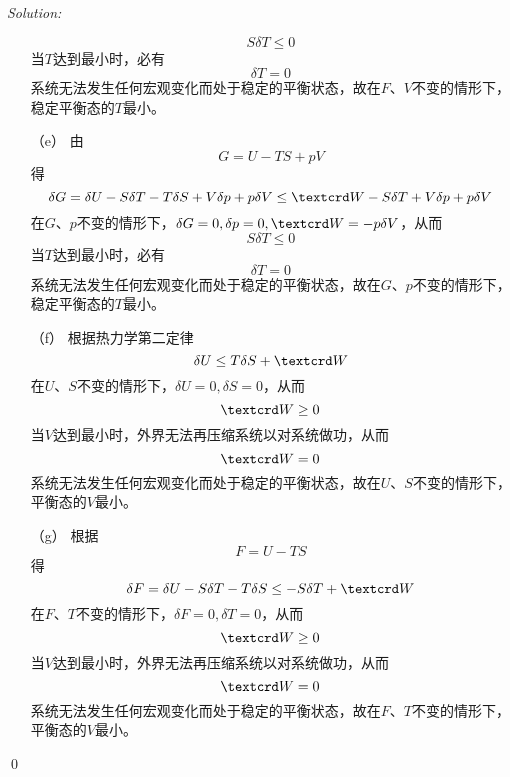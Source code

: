 \documentclass[12pt,a4paper]{article}
\newenvironment{sol}
    {\emph{Solution:}
    }
    {
    \qed
    }
\begin{document}
\begin{sol}
\begin{itemize}
\begin{equation}
S\delta T\leq 0
\end{equation}
当$T$达到最小时，必有
\begin{equation}
\delta T=0
\end{equation}
系统无法发生任何宏观变化而处于稳定的平衡状态，故在$F$、$V$不变的情形下，稳定平衡态的$T$最小。
\item[（e）] 由
\begin{equation}
G=U-TS+pV
\end{equation}
得
\begin{equation}
\delta G=\delta U-S\delta T-T\delta S+V\delta p+p\delta V\leq\text{\textcrd}W-S\delta T+V\delta p+p\delta V
\end{equation}
在$G$、$p$不变的情形下，$\delta G=0,\delta p=0,\text{\textcrd}W=-p\delta V$，从而
\begin{equation}
S\delta T\leq0
\end{equation}
当$T$达到最小时，必有
\begin{equation}
\delta T=0
\end{equation}
系统无法发生任何宏观变化而处于稳定的平衡状态，故在$G$、$p$不变的情形下，稳定平衡态的$T$最小。
\item[（f）] 根据热力学第二定律
\begin{equation}
\delta U\leq T\delta S+\text{\textcrd}W
\end{equation}
在$U$、$S$不变的情形下，$\delta U=0,\delta S=0$，从而
\begin{equation}
\text{\textcrd}W\geq0
\end{equation}
当$V$达到最小时，外界无法再压缩系统以对系统做功，从而
\begin{equation}
\text{\textcrd}W=0
\end{equation}
系统无法发生任何宏观变化而处于稳定的平衡状态，故在$U$、$S$不变的情形下，平衡态的$V$最小。
\item[（g）] 根据
\begin{equation}
F=U-TS
\end{equation}
得
\begin{equation}
\delta F=\delta U-S\delta T-T\delta S\leq -S\delta T+\text{\textcrd}W
\end{equation}
在$F$、$T$不变的情形下，$\delta F=0,\delta T=0$，从而
\begin{equation}
\text{\textcrd}W\geq0
\end{equation}
当$V$达到最小时，外界无法再压缩系统以对系统做功，从而
\begin{equation}
\text{\textcrd}W=0
\end{equation}
系统无法发生任何宏观变化而处于稳定的平衡状态，故在$F$、$T$不变的情形下，平衡态的$V$最小。
\end{itemize}
\end{sol}
\end{document}
